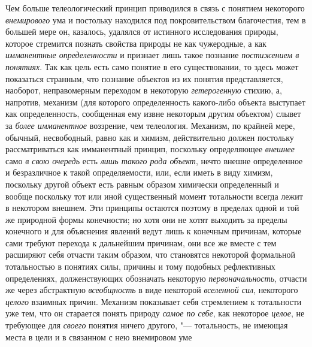 {{Чем больше телеологический принцип приводился в связь с
понятием некоторого {\em внемирового}
ума и постольку находился под покровительством благочестия,
тем в большей мере он, казалось, удалялся от истинного исследования
природы, которое стремится познать свойства природы не как чужеродные, а
как {\em имманентные определенности}
и признает лишь такое познание
{\em постижением в понятиях}.
Так как цель есть само понятие в его существовании, то здесь
может показаться странным, что познание объектов из их понятия
представляется, наоборот, неправомерным переходом в некоторую
{\em гетерогенную}
стихию, а, напротив, механизм (для которого определенность
какого-либо объекта выступает как определенность, сообщенная ему извне
некоторым другим объектом) слывет за
{\em более имманентное}
воззрение, чем телеология. Механизм, по крайней мере,
обычный, несвободный, равно как и химизм, действительно должен постольку
рассматриваться как имманентный принцип, поскольку определяющее
{\em внешнее} само
{\em в свою очередь} есть
{\em лишь такого рода объект},
нечто внешне определенное и безразличное к такой
определяемости, или, если иметь в виду химизм, поскольку другой объект есть
равным образом химически определенный и вообще поскольку тот или иной
существенный момент тотальности всегда лежит в некотором внешнем. Эти
принципы остаются поэтому в пределах одной и той же природной формы
конечности; но хотя они не хотят выходить за пределы
конечного и для объяснения явлений ведут лишь к конечным причинам, которые
сами требуют перехода к дальнейшим причинам, они все же вместе с тем
расширяют себя отчасти таким образом, что становятся некоторой формальной
тотальностью в понятиях силы, причины и тому подобных рефлективных
определениях, долженствующих обозначать некоторую
{\em первоначальность},
отчасти же через абстрактную
{\em всеобщность} в виде
некоторой {\em вселенной сил},
некоторого {\em целого}
взаимных причин. Механизм показывает себя стремлением к
тотальности уже тем, что он старается понять природу
{\em самое по себе}, как
некоторое {\em целое}, не
требующее для {\em своего}
понятия ничего другого, "--- тотальность, не
имеющая места в цели и в связанном с нею внемировом
уме}}
